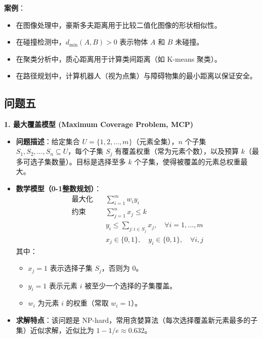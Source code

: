 \documentclass[UTF8]{article}
\begin{document}
\textbf{案例}：
\begin{itemize}[leftmargin=1.5em]
    \item 在图像处理中，豪斯多夫距离用于比较二值化图像的形状相似性。
    \item 在碰撞检测中，$d_{\min}(A, B) > 0$ 表示物体 $A$ 和 $B$ 未碰撞。
    \item 在聚类分析中，质心距离用于计算类间距离（如 K-means 聚类）。
    \item 在路径规划中，计算机器人（视为点集）与障碍物集的最小距离以保证安全。
\end{itemize}


\subsection*{问题五}
\textbf{1. 最大覆盖模型 (Maximum Coverage Problem, MCP)}
\vspace{0.5em}

\begin{itemize}[leftmargin=1.5em]
    \item \textbf{问题描述}：给定集合 $U = \{1, 2, \dots, m\}$（元素全集），$n$ 个子集 $S_1, S_2, \dots, S_n \subseteq U$，每个子集 $S_j$ 有覆盖权重（常为元素个数），以及预算 $k$（最多可选子集数量）。目标是选择至多 $k$ 个子集，使得被覆盖的元素总权重最大。
    
    \item \textbf{数学模型（0-1整数规划）}：
    \begin{align}
        \text{最大化} \quad & \sum_{i=1}^m w_i y_i \\
        \text{约束} \quad & \sum_{j=1}^n x_j \leq k \\
        & y_i \leq \sum_{j: i \in S_j} x_j, \quad \forall i = 1,\dots,m \\
        & x_j \in \{0,1\}, \quad y_i \in \{0,1\}, \quad \forall i,j
    \end{align}
    其中：
    \begin{itemize}
        \item $x_j = 1$ 表示选择子集 $S_j$，否则为 0。
        \item $y_i = 1$ 表示元素 $i$ 被至少一个选择的子集覆盖。
        \item $w_i$ 为元素 $i$ 的权重（常取 $w_i=1$）。
    \end{itemize}
    
    \item \textbf{求解特点}：该问题是 NP-hard，常用贪婪算法（每次选择覆盖新元素最多的子集）近似求解，近似比为 $1 - 1/e \approx 0.632$。
\end{itemize}
\end{document}
